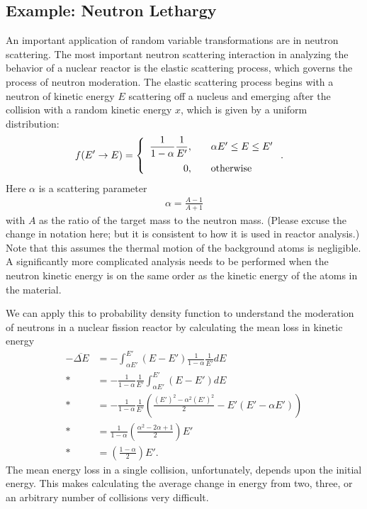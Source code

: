 \subsection{Example: Neutron Lethargy}

An important application of random variable transformations are in neutron scattering. The most important neutron scattering interaction in analyzing the behavior of a nuclear reactor is the elastic scattering process, which governs the process of neutron moderation. The elastic scattering process begins with a neutron of kinetic energy $E$ scattering off a nucleus and emerging after the collision with a random kinetic energy $x$, which is given by a uniform distribution:
\begin{align}
  f(E' \rightarrow E ) &= \left\{ \begin{array}{r l}
  \dfrac{1}{1-\alpha} \dfrac{1}{E'}, & \quad \alpha E' \le E \le E' \vspace{0.2cm} \\
  0, & \quad \text{otherwise} \\ \end{array} \right. .
\end{align}
Here $\alpha$ is a scattering parameter
\begin{align}
  \alpha = \frac{ A - 1 }{ A + 1 }
\end{align}
with $A$ as the ratio of the target mass to the neutron mass. (Please excuse the change in notation here; but it is consistent to how it is used in reactor analysis.) Note that this assumes the thermal motion of the background atoms is negligible. A significantly more complicated analysis needs to be performed when the neutron kinetic energy is on the same order as the kinetic energy of the atoms in the material.

We can apply this to probability density function to understand the moderation of neutrons in a nuclear fission reactor by calculating the mean loss in kinetic energy
\begin{align}
  -\overline{ \Delta E } &= -\int_{\alpha E'}^{E'} ( E - E' )  \frac{1}{1-\alpha} \frac{1}{E'} dE \nonumber \\*
  &= -\frac{1}{1 - \alpha} \frac{1}{E'} \int_{\alpha E'}^{E'} ( E - E' ) dE \nonumber \\*
  &= -\frac{1}{1 - \alpha} \frac{1}{E'} \left( \frac{(E')^2  - \alpha^2 (E')^2 }{2} - E' ( E' - \alpha E' ) \right) \nonumber \\*
  &= \frac{1}{1 - \alpha}\left( \frac{\alpha^2 - 2 \alpha + 1 }{2} \right) E'  \nonumber \\*
  &= \left( \frac{1 - \alpha}{2} \right) E' .
\end{align}
The mean energy loss in a single collision, unfortunately, depends upon the initial energy. This makes calculating the average change in energy from two, three, or an arbitrary number of collisions very difficult.


